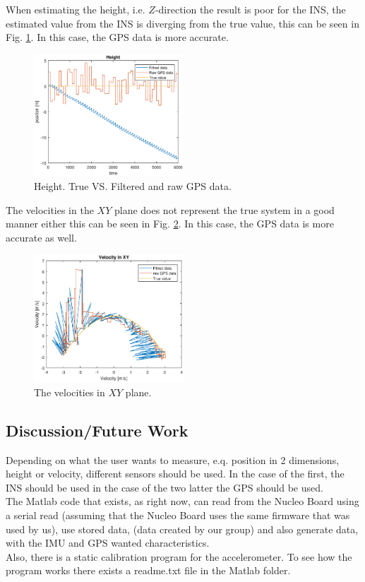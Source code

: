 When estimating the height, i.e. $Z$-direction the result is poor for the INS, the estimated value from the INS is diverging from the true value, this can be seen in Fig. \ref{Fig:Height}. In this case, the GPS data is more accurate. 
\begin{figure}[H]
\centering
\includegraphics[width=0.5\textwidth]{Height.eps}
\caption{Height. True VS. Filtered and raw GPS data.}
\label{Fig:Height}
\end{figure}
The velocities in the $XY$ plane does not represent the true system in a good manner either this can be seen in Fig. \ref{Fig:velocity}. In this case, the GPS data is more accurate as well.

\begin{figure}[H]
\centering
\includegraphics[width=0.5\textwidth]{velocity.eps}
\caption{The velocities in $XY$ plane.}
\label{Fig:velocity}
\end{figure}
\subsection{Discussion/Future Work}
Depending on what the user wants to measure, e.q. position in 2 dimensions, height or velocity, different sensors should be used. In the case of the first, the INS should be used in the case of the two latter the GPS should be used. \\

The Matlab code that exists, as right now, can read from the Nucleo Board using a serial read (assuming that the Nucleo Board uses the same firmware that was used by us), use stored data, (data created by our group) and also generate data, with the IMU and GPS wanted characteristics. \\
Also, there is a static calibration program for the accelerometer. To see how the program works there exists a readme.txt file in the Matlab folder.\\

